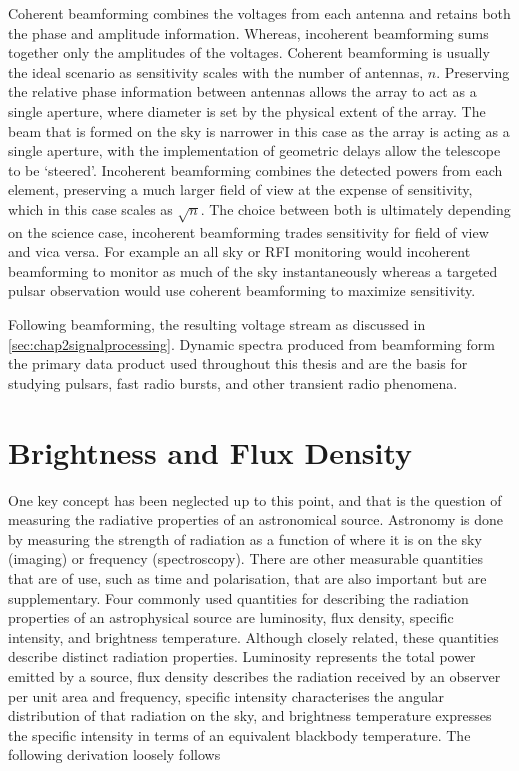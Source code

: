 Coherent beamforming combines the voltages from each antenna and retains both the phase and amplitude information. Whereas, incoherent beamforming sums together only the amplitudes of the voltages. Coherent beamforming is usually the ideal scenario as sensitivity scales with the number of antennas, $n$. Preserving the relative phase information between antennas allows the array to act as a single aperture, where diameter is set by the physical extent of the array. The beam that is formed on the sky is narrower in this case as the array is acting as a single aperture, with the implementation of geometric delays allow the telescope to be `steered'.  
Incoherent beamforming combines the detected powers from each element, preserving a much larger field of view at the expense of sensitivity, which in this case scales as $\sqrt{n}$. The choice between both is ultimately depending on the science case, incoherent beamforming trades sensitivity for field of view and vica versa. For example an all sky or RFI monitoring would incoherent beamforming to monitor as much of the sky instantaneously whereas a targeted pulsar observation would use coherent beamforming to maximize sensitivity. 

Following beamforming, the resulting voltage stream as discussed in \cref{sec:chap2signalprocessing}. Dynamic spectra produced from beamforming form the primary data product used throughout this thesis and are the basis for studying pulsars, fast radio bursts, and other transient radio phenomena.

\section{Brightness and Flux Density}

One key concept has been neglected up to this point, and that is the question of measuring the radiative properties of an astronomical source. Astronomy is done by measuring the strength of radiation as a function of where it is on the sky (imaging) or frequency (spectroscopy). There are other measurable quantities that are of use, such as time and polarisation, that are also important but are supplementary. Four commonly used quantities for describing the radiation properties of an astrophysical source are luminosity, flux density, specific intensity, and brightness temperature. Although closely related, these quantities describe distinct radiation properties. Luminosity represents the total power emitted by a source, flux density describes the radiation received by an observer per unit area and frequency, specific intensity characterises the angular distribution of that radiation on the sky, and brightness temperature expresses the specific intensity in terms of an equivalent blackbody temperature. The following derivation loosely follows \citet[pp. 23 - 30][]{EssenRadio16}

